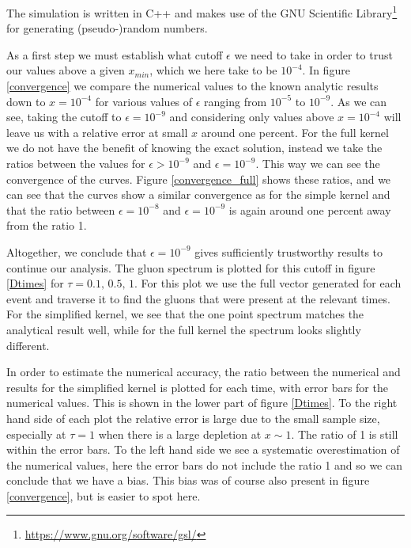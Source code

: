 \documentclass[a4paper,12pt]{article}
\numberwithin{equation}{section}
\begin{document}
The simulation is written in C++ and makes use of the GNU Scientific Library\footnote{\url{https://www.gnu.org/software/gsl/}} for generating (pseudo-)random numbers.









As a first step we must establish what cutoff $\epsilon$ we need to take in order to trust our values above a given $x_{min}$, which we here take to be $10^{-4}$. In figure \ref{convergence} we compare the numerical values to the known analytic results down to $x=10^{-4}$ for various values of $\epsilon$ ranging from $10^{-5}$ to $10^{-9}$. As we can see, taking the cutoff to $\epsilon=10^{-9}$ and considering only values above $x=10^{-4}$ will leave us with a relative error at small $x$ around one percent. For the full kernel we do not have the benefit of knowing the exact solution, instead we take the ratios between the values for $\epsilon>10^{-9}$ and $\epsilon=10^{-9}$. This way we can see the convergence of the curves. Figure \ref{convergence_full} shows these ratios, and we can see that the curves show a similar convergence as for the simple kernel and that the ratio between $\epsilon=10^{-8}$ and $\epsilon=10^{-9}$ is again around one percent away from the ratio 1.



Altogether, we conclude that $\epsilon=10^{-9}$ gives sufficiently trustworthy results to continue our analysis.  The gluon spectrum is plotted for this cutoff in figure \ref{Dtimes} for $\tau=0.1,\,0.5,\,1$. For this plot we use the full vector generated for each event and traverse it to find the gluons that were present at the relevant times. For the simplified kernel, we see that the one point spectrum matches the analytical result well, while for the  full kernel the spectrum looks slightly different. 

In order to estimate the numerical accuracy, the ratio between the numerical and results for the simplified kernel is plotted for each time, with error bars for the numerical values. This is shown in the lower part of figure \ref{Dtimes}. To the right hand side of each plot the relative error is large due to the small sample size, especially at $\tau=1$ when there is a large depletion at $x \sim 1$. The ratio of 1 is still within the error bars. To the left hand side we see a systematic overestimation of the numerical values, here the error bars do not include the ratio 1 and so we can conclude that we have a bias. This bias was of course also present in figure \ref{convergence}, but is easier to spot here.
\end{document}
